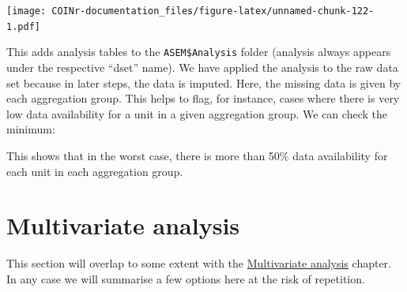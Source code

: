 \documentclass[
]{book}
\newenvironment{Shaded}{\begin{snugshade}}{\end{snugshade}}
\newcommand{\AttributeTok}[1]{\textcolor[rgb]{0.77,0.63,0.00}{#1}}
\newcommand{\CommentTok}[1]{\textcolor[rgb]{0.56,0.35,0.01}{\textit{#1}}}
\newcommand{\DecValTok}[1]{\textcolor[rgb]{0.00,0.00,0.81}{#1}}
\newcommand{\DocumentationTok}[1]{\textcolor[rgb]{0.56,0.35,0.01}{\textbf{\textit{#1}}}}
\newcommand{\FunctionTok}[1]{\textcolor[rgb]{0.00,0.00,0.00}{#1}}
\newcommand{\NormalTok}[1]{#1}
\newcommand{\OtherTok}[1]{\textcolor[rgb]{0.56,0.35,0.01}{#1}}
\newcommand{\SpecialCharTok}[1]{\textcolor[rgb]{0.00,0.00,0.00}{#1}}
\newcommand{\StringTok}[1]{\textcolor[rgb]{0.31,0.60,0.02}{#1}}
\begin{document}
\begin{Shaded}
\end{Shaded}

\texttt{[image: COINr-documentation\_files/figure-latex/unnamed-chunk-122-1.pdf]}

This adds analysis tables to the \texttt{ASEM\$Analysis} folder (analysis always appears under the respective ``dset'' name). We have applied the analysis to the raw data set because in later steps, the data is imputed. Here, the missing data is given by each aggregation group. This helps to flag, for instance, cases where there is very low data availability for a unit in a given aggregation group. We can check the minimum:

\begin{Shaded}
\end{Shaded}

This shows that in the worst case, there is more than 50\% data availability for each unit in each aggregation group.

\hypertarget{multivariate-analysis-1}{%
\section{Multivariate analysis}\label{multivariate-analysis-1}}

This section will overlap to some extent with the \protect\hyperlink{multivariate-analysis-1}{Multivariate analysis} chapter. In any case we will summarise a few options here at the risk of repetition.
\end{document}
